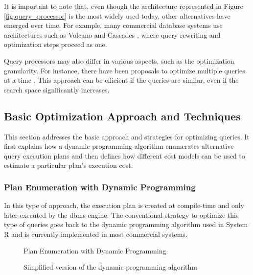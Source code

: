 \bigbreak

\noindent It is important to note that, even though the architecture represented in Figure \ref{fig:query_processor} is the most widely used today, other alternatives have emerged over time. For example, many commercial database systems use architectures such as Volcano \citep{Graefe1993} and Cascades \citep{Graefe1995}, where query rewriting and optimization steps proceed as one.

Query processors may also differ in various aspects, such as the optimization granularity. For instance, there have been proposals to optimize multiple queries at a time \citep{Sellis1988}. This approach can be efficient if the queries are similar, even if the search space significantly increases.

\subsection{Basic Optimization Approach and Techniques}
\label{sec:basic_optimization_approach}

This section addresses the basic approach and strategies for optimizing queries. It first explains how a dynamic programming algorithm enumerates alternative query execution plans and then defines how different cost models can be used to estimate a particular plan's execution cost.

\subsubsection{Plan Enumeration with Dynamic Programming} 
\label{sec:dynamic_programming}

In this type of approach, the execution plan is created at compile-time and only later executed by the \gls{dbms} engine. The conventional strategy to optimize this type of queries goes back to the dynamic programming algorithm used in System R \citep{Selinger1979} and is currently implemented in most commercial systems.

\begin{figure}[ht]
\begin{algorithm}[H]
\SetAlgoLined
\DontPrintSemicolon
{}
\caption{Plan Enumeration with Dynamic Programming}
\end{algorithm}
\caption{Simplified version of the dynamic programming algorithm \citep{Ozsu2011}}
\label{fig:dynamic_programming}
\end{figure}

